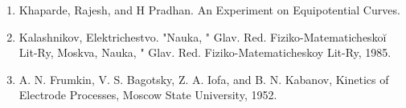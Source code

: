 \documentclass{article}
\begin{document}
  
  
\begin{enumerate}
\item Khaparde, Rajesh, and H Pradhan. An Experiment on Equipotential Curves.
\item Kalashnikov, Elektrichestvo. "Nauka, " Glav. Red. Fiziko-Matematicheskoĭ Lit-Ry, Moskva, Nauka, " Glav. Red. Fiziko-Matematicheskoy Lit-Ry, 1985.
\item A. N. Frumkin, V. S. Bagotsky, Z. A. Iofa, and B. N. Kabanov, Kinetics of Electrode Processes, Moscow State University, 1952.

\end{enumerate}
\end{document}
